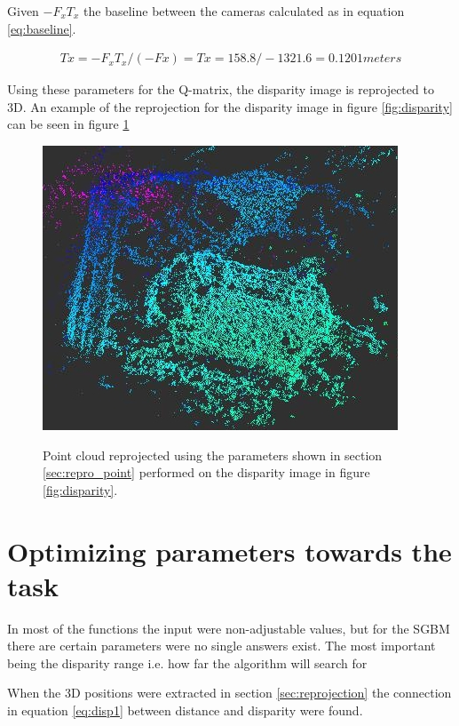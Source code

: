 Given $ -F_{x}T_{x} $ the baseline between the cameras calculated as in equation \ref{eq:baseline}.

\begin{equation}\label{eq:baseline}
\begin{split}
Tx = -F_{x}T_{x}/(-Fx) = Tx = 158.8/-1321.6 = 0.1201 meters
\end{split}
\end{equation} 

Using these parameters for the Q-matrix, the disparity image is reprojected to 3D. An example of the reprojection for the disparity image in figure \ref{fig:disparity} can be seen in figure \ref{fig:point_repro}


\begin{figure}[h!]
  \caption{Point cloud reprojected using the parameters shown in section \ref{sec:repro_point} performed on the disparity image in figure \ref{fig:disparity}. }
  \centering
    \includegraphics[scale=0.7]{graphics/06_vision/point_cloud_example2.jpg} %
    \label{fig:point_repro}
\end{figure}


\section{ Optimizing parameters towards the task } \label{sec:optimizing_parameters}

In most of the functions the input were non-adjustable values, but for the SGBM there are certain parameters were no single answers exist. The most important being the disparity range i.e. how far the algorithm will search for 


When the 3D positions were extracted in section \ref{sec:reprojection} the connection in equation \ref{eq:disp1} between distance and disparity were found.

